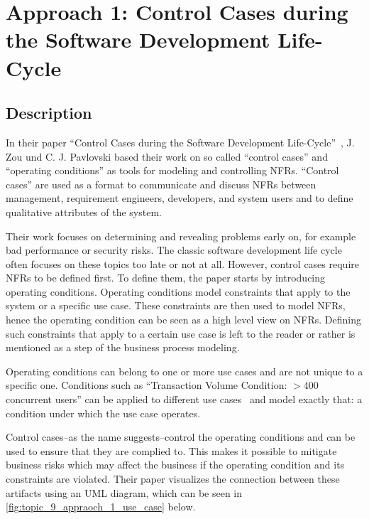 

\section{Approach 1: Control Cases during the Software Development Life-Cycle } \label{sec:9_approach_1}


\subsection{Description}

In their paper \enquote{Control Cases during the Software Development Life-Cycle}~\cite{ZouPavlovski2008}, J. Zou und C. J. Pavlovski based their work on so called  \enquote{control cases} and \enquote{operating conditions} as tools for modeling and controlling NFRs.
\newpage
\enquote{Control cases} are used as a format to communicate and discuss NFRs between management, requirement engineers, developers, and system users and to define qualitative attributes of the system.

Their work focuses on determining and revealing problems early on, for example bad performance or security risks.
The classic software development life cycle often focuses on these topics too late or not at all.
However, control cases require NFRs to be defined first.
To define them, the paper starts by introducing operating conditions.
Operating conditions model constraints that apply to the system or a specific use case. These constraints are then used to model NFRs, hence the operating condition can be seen as a high level view on NFRs.
Defining such constraints that apply to a certain use case is left to the reader or rather is mentioned as a step of the business process modeling.

Operating conditions can belong to one or more use cases and are not unique to a specific one. Conditions such as \enquote{Transaction Volume Condition: $>$400 concurrent users} can be applied to different use cases~\cite{ZouPavlovski2008} and model exactly that: a condition under which the use case operates.

Control cases--as the name suggests--control the operating conditions and can be used to ensure that they are complied to.
This makes it possible to mitigate business risks which may affect the business if the operating condition and its constraints are violated.
Their paper visualizes the connection between these artifacts using an UML diagram, which can be seen in \autoref{fig:topic_9_appraoch_1_use_case} below.

